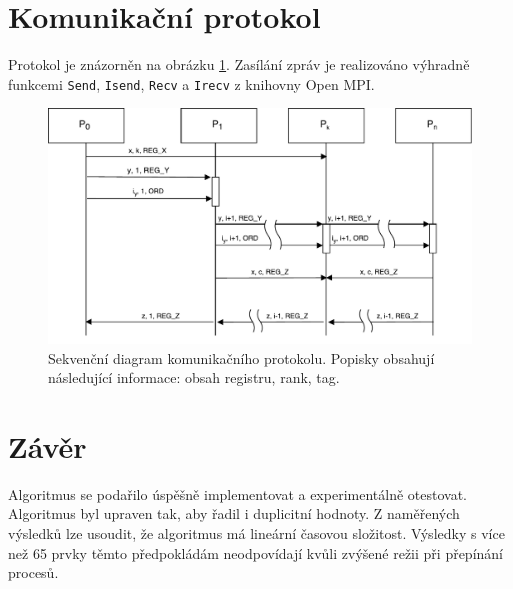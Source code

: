 \documentclass[11pt,a4paper]{article}
\begin{document}
\section{Komunikační protokol}
\label{proto}

Protokol je znázorněn na obrázku \ref{proto_schema}. Zasílání zpráv je realizováno výhradně funkcemi \texttt{Send}, \texttt{Isend}, \texttt{Recv} a \texttt{Irecv} z knihovny Open MPI.

\begin{figure}[!h]
    \includegraphics[width=0.7\linewidth]{protokol}
    \centering
    \caption{Sekvenční diagram komunikačního protokolu. Popisky obsahují následující informace: obsah registru, rank, tag.}
    \label{proto_schema}
\end{figure}


\section{Závěr}

Algoritmus se podařilo úspěšně implementovat a experimentálně otestovat. Algoritmus byl upraven tak, aby řadil i duplicitní hodnoty. Z naměřených výsledků lze usoudit, že algoritmus má lineární časovou složitost. Výsledky s více než 65 prvky těmto předpokládám neodpovídají kvůli zvýšené režii při přepínání procesů.




\makeatletter
\makeatother

\end{document}

